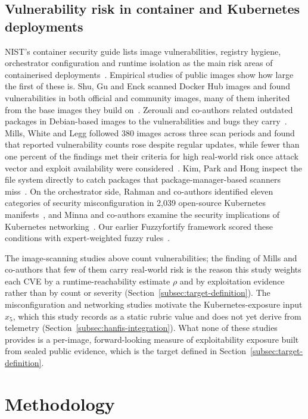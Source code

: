 \documentclass[referee,lineno,pdflatex,sn-basic]{sn-jnl}%
\theoremstyle{thmstyleone}%
\theoremstyle{thmstyletwo}%
\theoremstyle{thmstylethree}%
\begin{document}
\subsection{Vulnerability risk in container and Kubernetes deployments}\label{subsec:lit-k8s}
NIST's container security guide lists image vulnerabilities, registry hygiene, orchestrator configuration and runtime isolation as the main risk areas of containerised deployments~\citep{nist_sp800190}. Empirical studies of public images show how large the first of these is. Shu, Gu and Enck scanned Docker Hub images and found vulnerabilities in both official and community images, many of them inherited from the base images they build on~\citep{shu2017dockerhub}. Zerouali and co-authors related outdated packages in Debian-based images to the vulnerabilities and bugs they carry~\citep{zerouali2019outdated}. Mills, White and Legg followed 380 images across three scan periods and found that reported vulnerability counts rose despite regular updates, while fewer than one percent of the findings met their criteria for high real-world risk once attack vector and exploit availability were considered~\citep{mills2023longitudinal}. Kim, Park and Hong inspect the file system directly to catch packages that package-manager-based scanners miss~\citep{kim2025container}. On the orchestrator side, Rahman and co-authors identified eleven categories of security misconfiguration in 2,039 open-source Kubernetes manifests~\citep{rahman2023misconfig}, and Minna and co-authors examine the security implications of Kubernetes networking~\citep{minna2021k8snet}. Our earlier Fuzzyfortify framework scored these conditions with expert-weighted fuzzy rules~\citep{bib1}.

The image-scanning studies above count vulnerabilities; the finding of Mills and co-authors that few of them carry real-world risk is the reason this study weights each CVE by a runtime-reachability estimate $\rho$ and by exploitation evidence rather than by count or severity (Section~\ref{subsec:target-definition}). The misconfiguration and networking studies motivate the Kubernetes-exposure input $x_5$, which this study records as a static rubric value and does not yet derive from telemetry (Section~\ref{subsec:hanfis-integration}). What none of these studies provides is a per-image, forward-looking measure of exploitability exposure built from sealed public evidence, which is the target defined in Section~\ref{subsec:target-definition}.

\section{Methodology}\label{sec3}
\end{document}
